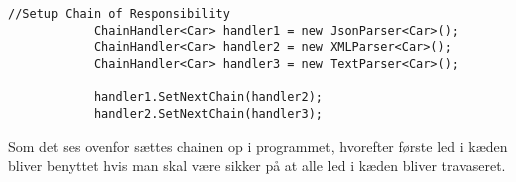 \begin{lstlisting}
//Setup Chain of Responsibility
            ChainHandler<Car> handler1 = new JsonParser<Car>();
            ChainHandler<Car> handler2 = new XMLParser<Car>();
            ChainHandler<Car> handler3 = new TextParser<Car>();

            handler1.SetNextChain(handler2);
            handler2.SetNextChain(handler3);
\end{lstlisting} 
   
Som det ses ovenfor sættes chainen op i programmet, hvorefter første led i kæden bliver benyttet hvis man skal være sikker på at alle led i kæden bliver travaseret. 


